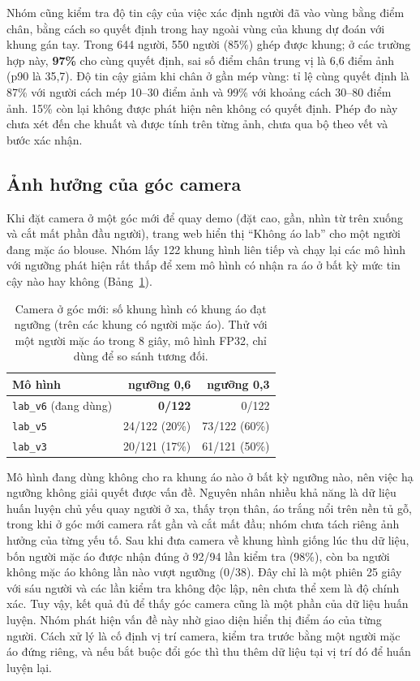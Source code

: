 \documentclass[11pt,a4paper,twocolumn]{article}
\begin{document}
Nhóm cũng kiểm tra độ tin cậy của việc xác định người đã vào vùng bằng điểm chân, bằng cách so quyết định trong hay ngoài vùng của khung dự đoán với khung gán tay. Trong 644 người, 550 người (85\%)
ghép được khung; ở các trường hợp này, \textbf{97\%} cho cùng quyết định, sai số điểm chân trung vị là 6,6 điểm ảnh (p90 là 35,7). Độ tin cậy giảm khi chân ở gần mép vùng: tỉ lệ cùng quyết định
là 87\% với người cách mép 10--30 điểm ảnh và 99\% với khoảng cách 30--80 điểm ảnh. 15\% còn lại không được phát hiện nên không có quyết định. Phép đo này chưa xét đến che khuất và được tính trên
từng ảnh, chưa qua bộ theo vết và bước xác nhận.

\subsection{Ảnh hưởng của góc camera}
\label{sec:angle}

Khi đặt camera ở một góc mới để quay demo (đặt cao, gần, nhìn từ trên xuống và cắt mất phần đầu người), trang web hiển thị ``Không áo lab'' cho một người đang mặc áo blouse. Nhóm lấy 122
khung hình liên tiếp và chạy lại các mô hình với ngưỡng phát hiện rất thấp để xem mô hình có nhận ra áo ở bất kỳ mức tin cậy nào hay không (Bảng~\ref{tab:angle}).

\begin{table}[t]
\centering
\caption{Camera ở góc mới: số khung hình có khung áo đạt ngưỡng (trên các khung có người mặc áo). Thử với một người mặc áo trong 8 giây, mô hình FP32, chỉ dùng để so sánh tương đối.}
\label{tab:angle}
\footnotesize
\begin{tabular}{@{}lrr@{}}
\toprule
Mô hình & ngưỡng 0,6 & ngưỡng 0,3 \\
\midrule
\texttt{lab\_v6} (đang dùng) & \textbf{0/122} & 0/122 \\
\texttt{lab\_v5} & 24/122 (20\%) & 73/122 (60\%) \\
\texttt{lab\_v3} & 20/121 (17\%) & 61/121 (50\%) \\
\bottomrule
\end{tabular}
\end{table}

Mô hình đang dùng không cho ra khung áo nào ở bất kỳ ngưỡng nào, nên việc hạ ngưỡng không giải quyết được vấn đề. Nguyên nhân nhiều khả năng là dữ liệu huấn luyện chủ yếu quay người ở xa,
thấy trọn thân, áo trắng nổi trên nền tủ gỗ, trong khi ở góc mới camera rất gần và cắt mất đầu; nhóm chưa tách riêng ảnh hưởng của từng yếu tố. Sau khi đưa camera về khung hình giống lúc thu
dữ liệu, bốn người mặc áo được nhận đúng ở 92/94 lần kiểm tra (98\%), còn ba người không mặc áo không lần nào vượt ngưỡng (0/38). Đây chỉ là một phiên 25 giây với sáu người và các lần kiểm tra
không độc lập, nên chưa thể xem là độ chính xác. Tuy vậy, kết quả đủ để thấy góc camera cũng là một phần của dữ liệu huấn luyện. Nhóm phát hiện vấn đề này nhờ giao diện hiển thị điểm áo của từng
người. Cách xử lý là cố định vị trí camera, kiểm tra trước bằng một người mặc áo đứng riêng, và nếu bắt buộc đổi góc thì thu thêm dữ liệu tại vị trí đó để huấn luyện lại.
\end{document}

